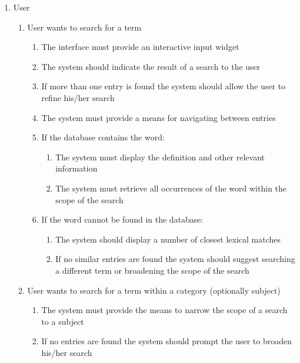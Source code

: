 \documentclass[11pt]{article} %
\begin{document}
\begin{enumerate}[{VP}1.]
	\item User
	\begin{enumerate}[{BE1}.1]
		\item User wants to search for a term
		\begin{enumerate}
			\item The interface must provide an interactive input widget
			\item The system should indicate the result of a search to the user
			\item If more than one entry is found the system should allow the user to refine his/her search
			\item The system must provide a means for navigating between entries
			\item If the database contains the word:
			\begin{enumerate}
			 	\item The system must display the definition and other relevant information
				\item The system must retrieve all occurrences of the word within the scope of the search
			\end{enumerate}
			\item If the word cannot be found in the database:
			\begin{enumerate}
				\item The system should display a number of closest lexical matches
				\item If no similar entries are found the system should suggest searching a different term or broadening the 					scope of the search
			\end{enumerate}
		\end{enumerate}
		\item User wants to search for a term within a category (optionally subject)
		\begin{enumerate}
			\item The system must provide the means to narrow the scope of a search to a subject
			\item If no entries are found the system should prompt the user to broaden his/her search
		\end{enumerate}
	\end{enumerate}

\end{enumerate}
\end{document}

